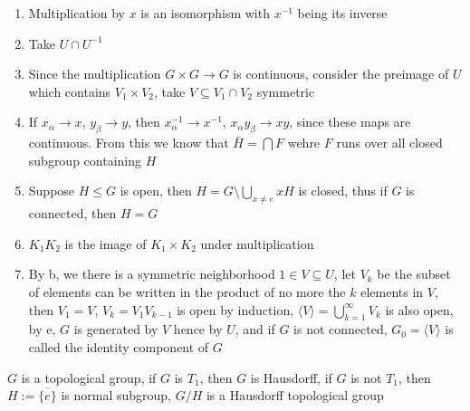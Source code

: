 \documentclass[main]{subfiles}
\begin{document}
\begin{solution}
\begin{enumerate}[{label=\textbf{\arabic*.}}, leftmargin=*]
\item Multiplication by $x$ is an isomorphism with $x^{-1}$ being its inverse 
\item Take $U\cap U^{-1}$ 
\item Since the multiplication $G\times G\to G$ is continuous, consider the preimage of $U$ which contains $V_1\times V_2$, take $V\subseteq V_1\cap V_2$ symmetric 
\item If $x_\alpha\to x$, $y_\beta\to y$, then $x_\alpha^{-1}\to x^{-1}$, $x_\alpha y_\beta\to xy$, since these maps are continuous. From this we know that $\bar H=\bigcap F$ wehre $F$ runs over all closed subgroup containing $H$ 
\item Suppose $H\leq G$ is open, then $\displaystyle H=G\setminus \bigcup_{x\neq e}xH$ is closed, thus if $G$ is connected, then $H=G$
\item $K_1K_2$ is the image of $K_1\times K_2$ under multiplication
\item By b, we there is a symmetric neighborhood $1\in V\subseteq U$, let $V_k$ be the subset of elements can be written in the product of no more the $k$ elements in $V$, then $V_1=V$, $V_k=V_1V_{k-1}$ is open by induction, $\langle V\rangle=\displaystyle\bigcup_{k=1}^\infty V_k$ is also open, by e, $G$ is generated by $V$ hence by $U$, and if $G$ is not connected, $G_0=\langle V\rangle$ is called the identity component of $G$
\end{enumerate}
\end{solution}

\begin{exercise}
$G$ is a topological group, if $G$ is $T_1$, then $G$ is Hausdorff, if $G$ is not $T_1$, then $H:=\overline{\{e\}}$ is normal subgroup, $G/H$ is a Hausdorff topological group
\end{exercise}
\end{document}
